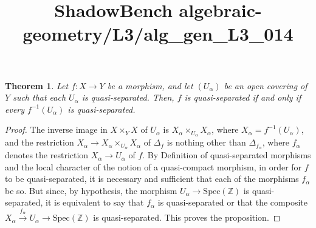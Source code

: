 \documentclass{article}
\title{ShadowBench algebraic-geometry/L3/alg\_gen\_L3\_014}
\newtheorem{theorem}{Theorem}
\begin{document}
\maketitle

\begin{theorem}
Let \(f:X\to Y\) be a morphism, and let \((U_\alpha)\) be an open covering of \(Y\) such that each \(U_\alpha\) is quasi-separated. Then, \(f\) is quasi-separated if and only if every \(f^{-1}(U_\alpha)\) is quasi-separated.
\end{theorem}
\begin{proof}
The inverse image in \(X\times_Y X\) of \(U_\alpha\) is \(X_\alpha\times_{U_\alpha}X_\alpha\), where \(X_\alpha=f^{-1}(U_\alpha)\), and the restriction \(X_\alpha\to X_\alpha\times_{U_\alpha}X_\alpha\) of \(\Delta_f\) is nothing other than \(\Delta_{f_\alpha}\), where \(f_\alpha\) denotes the restriction \(X_\alpha\to U_\alpha\) of \(f\). By Definition of quasi-separated morphisms and the local character of the notion of a quasi-compact morphism, in order for \(f\) to be quasi-separated, it is necessary and sufficient that each of the morphisms \(f_\alpha\) be so. But since, by hypothesis, the morphism \(U_\alpha\to \mathrm{Spec}(\mathbb Z)\) is quasi-separated, it is equivalent to say that \(f_\alpha\) is quasi-separated or that the composite \(X_\alpha\xrightarrow{f_\alpha}U_\alpha\to \mathrm{Spec}(\mathbb Z)\) is quasi-separated. This proves the proposition.
\end{proof}
\end{document}
